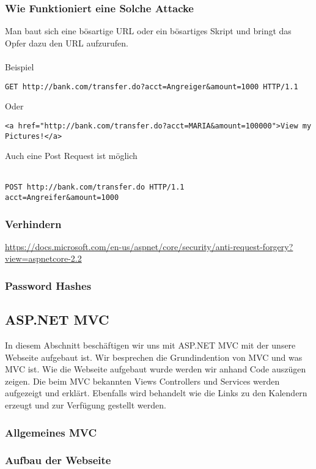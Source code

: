 {\subsubsection{Wie Funktioniert eine Solche Attacke}
Man baut sich eine bösartige URL oder ein bösartiges Skript und bringt das Opfer dazu den URL aufzurufen. 
\\ \\
Beispiel
\begin{lstlisting}
GET http://bank.com/transfer.do?acct=Angreiger&amount=1000 HTTP/1.1
\end{lstlisting}
Oder
\begin{lstlisting}
<a href="http://bank.com/transfer.do?acct=MARIA&amount=100000">View my Pictures!</a>
\end{lstlisting}
Auch eine Post Request ist möglich
\\ \\
\begin{lstlisting}
POST http://bank.com/transfer.do HTTP/1.1
acct=Angreifer&amount=1000
\end{lstlisting}
\subsubsection{Verhindern}
\url{https://docs.microsoft.com/en-us/aspnet/core/security/anti-request-forgery?view=aspnetcore-2.2}
\label{sec:sqli}
\subsubsection{Password Hashes}
\label{sec:hash}
\subsection{ASP.NET MVC}
In diesem Abschnitt beschäftigen wir uns mit ASP.NET MVC mit der unsere Webseite aufgebaut ist. Wir besprechen die Grundindention von MVC und was MVC ist. Wie die Webseite aufgebaut wurde werden wir anhand Code auszügen zeigen. Die beim MVC bekannten Views Controllers und Services werden aufgezeigt und erklärt. Ebenfalls wird behandelt wie die Links zu den Kalendern erzeugt und zur Verfügung gestellt werden. 

\label{sec:MVC}
\subsubsection{Allgemeines MVC}
\label{sec:allgemein}

\subsubsection{Aufbau der Webseite }
\label{sec:aufbau}
}
